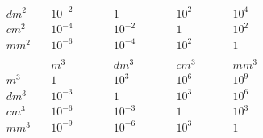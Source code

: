 \documentclass[twocolumn]{article}
\begin{document}
\begin{multicols}{2}
\begin{alignat*}{4}
		dm^2 	\quad	& 10^{-2}\quad &&\quad 1\quad &&\quad 10^{2}\quad &&\quad 10^{4}\quad \quad \\
		cm^2 	\quad	& 10^{-4}\quad &&\quad 10^{-2}\quad &&\quad 1\quad &&\quad 10^{2}\quad \quad \\
		mm^2 	\quad	& 10^{-6}\quad &&\quad 10^{-4}\quad &&\quad 10^{2}\quad &&\quad 1\quad \quad \\
	\end{alignat*}
	\begin{alignat*}{4} 
			& m^3 \quad && \quad dm^3 && \quad cm^3 && \quad mm^3 \\
		m^3 	\quad& 1\quad &&\quad 10^3\quad &&\quad 10^6\quad &&\quad 10^9\quad \\
		dm^3 	\quad& 10^{-3}\quad &&\quad 1\quad &&\quad 10^{3}\quad &&\quad 10^{6}\quad \quad \\
		cm^3 	\quad& 10^{-6}\quad &&\quad 10^{-3}\quad &&\quad 1\quad &&\quad 10^{3}\quad \quad \\
		mm^3 	\quad& 10^{-9}\quad &&\quad 10^{-6}\quad &&\quad 10^{3}\quad &&\quad 1\quad \quad \\
	\end{alignat*}
\end{multicols}
\end{document}
